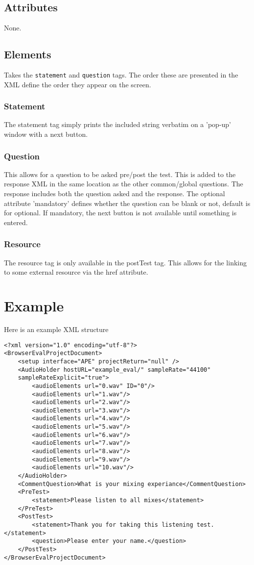 \documentclass{article}
\begin{document}
\subsection{Attributes}
None.

\subsection{Elements}
Takes the \texttt{statement} and \texttt{question} tags. The order these are presented in the XML define the order they appear on the screen.

\subsubsection{Statement}

The statement tag simply prints the included string verbatim on a 'pop-up' window with a next button.

\subsubsection{Question}

This allows for a question to be asked pre/post the test. This is added to the response XML in the same location as the other common/global questions. The response includes both the question asked and the response. The optional attribute 'mandatory' defines whether the question can be blank or not, default is for optional. If mandatory, the next button is not available until something is entered.

\subsubsection{Resource}

The resource tag is only available in the postTest tag. This allows for the linking to some external resource via the href attribute.

\section{Example}

Here is an example XML structure

\begin{lstlisting}
<?xml version="1.0" encoding="utf-8"?>
<BrowserEvalProjectDocument>
	<setup interface="APE" projectReturn="null" />
	<AudioHolder hostURL="example_eval/" sampleRate="44100"
	sampleRateExplicit="true">
		<audioElements url="0.wav" ID="0"/>
		<audioElements url="1.wav"/>
		<audioElements url="2.wav"/>
		<audioElements url="3.wav"/>
		<audioElements url="4.wav"/>
		<audioElements url="5.wav"/>
		<audioElements url="6.wav"/>
		<audioElements url="7.wav"/>
		<audioElements url="8.wav"/>
		<audioElements url="9.wav"/>
		<audioElements url="10.wav"/>
	</AudioHolder>
	<CommentQuestion>What is your mixing experiance</CommentQuestion>
	<PreTest>
		<statement>Please listen to all mixes</statement>
	</PreTest>
	<PostTest>
		<statement>Thank you for taking this listening test.</statement>
		<question>Please enter your name.</question>
	</PostTest>
</BrowserEvalProjectDocument>
\end{lstlisting}
\end{document}
